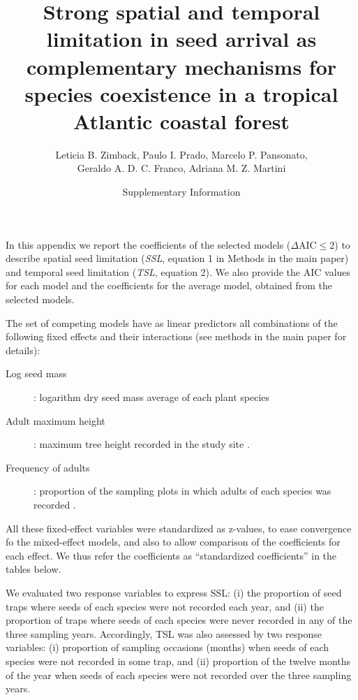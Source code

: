 \documentclass{article}
\begin{document}
\title{Strong spatial and temporal limitation in seed arrival as  complementary mechanisms for species coexistence in a tropical Atlantic coastal forest}


\author{Leticia B. Zimback, Paulo I. Prado, Marcelo P. Pansonato, \\ Geraldo A. D. C. Franco,  
Adriana M. Z. Martini}

\date{\Large Supplementary Information}

\maketitle


In this %
appendix
we report the coefficients of the selected models
($\Delta \mathrm{AIC} \leq 2$) to describe spatial seed limitation
(\emph{SSL}, equation 1 in Methods in the main paper) and temporal
seed limitation (\emph{TSL}, equation 2). We also provide the AIC
values for each model and the coefficients for the average model,
obtained from the selected models.


The set of competing models have as linear predictors all combinations
of the following fixed effects and their interactions (see methods in
the main paper for details):

\begin{description}
\item[Log seed mass]: logarithm dry seed mass average of each plant species
\item[Adult maximum height]:  maximum tree height recorded in the study site \cite{pansonato2018}.
\item[Frequency of adults]: proportion of the sampling plots in which adults of each species was recorded \cite{pansonato2018}. 
\end{description}

All these fixed-effect variables were standardized as z-values, to
ease convergence fo the mixed-effect models, and also to allow
comparison of the coefficients for each effect. We thus refer the
coefficients as ``standardized coefficients'' in the tables below.

We evaluated two response variables to express SSL: (i) the proportion
of seed traps where seeds of each species were not recorded each year,
and (ii) the proportion of traps where seeds of each species were
never recorded in any of the three sampling years. Accordingly, TSL
was also assessed by two response variables: (i) proportion of
sampling occasions (months) when seeds of each species were not
recorded in some trap, and (ii) proportion of the twelve months of the
year when seeds of each species were not recorded over the three
sampling years.
\end{document}
